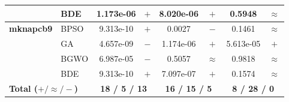 \begin{table}[htbp]
\begin{tabular*}{\textwidth}{@{\extracolsep{\fill}}llcccccc@{}}
                       & BDE   & 1.173e-06 & $+$ & 8.020e-06 & $+$ &    0.5948 & $\approx$ \\
    \midrule
    \textbf{mknapcb9}  & BPSO  & 9.313e-10 & $+$ &    0.0027 & $-$ &    0.1461 & $\approx$ \\
                       & GA    & 4.657e-09 & $-$ & 1.174e-06 & $+$ & 5.613e-05 & $+$ \\
                       & BGWO  & 6.987e-05 & $-$ &    0.5057 & $\approx$ &    0.9818 & $\approx$ \\
                       & BDE   & 9.313e-10 & $+$ & 7.097e-07 & $+$ &    0.1574 & $\approx$ \\
    \midrule
    \multicolumn{2}{l}{\textbf{Total ($+ / \approx / -$)}} & \multicolumn{2}{c}{\textbf{18 / 5 / 13}}  & \multicolumn{2}{c}{\textbf{16 / 15 / 5}}  & \multicolumn{2}{c}{\textbf{8 / 28 / 0}} \\
    \bottomrule
  \end{tabular*}
  \vspace{1ex}
\end{table}
